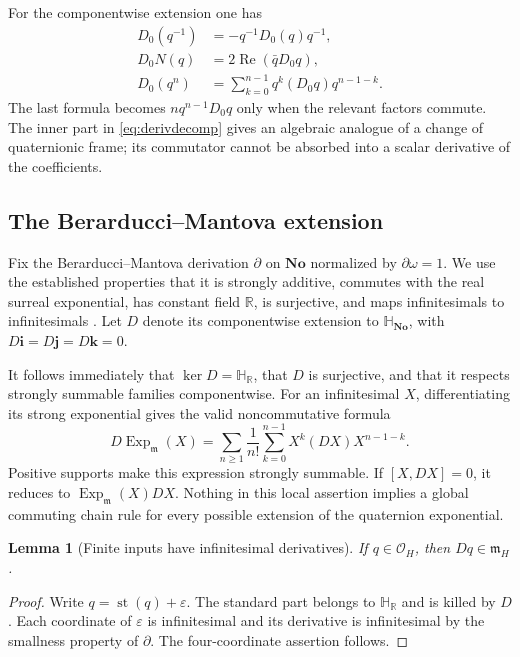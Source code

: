 \documentclass[11pt,letterpaper]{article}
\numberwithin{equation}{section}
\newtheorem{lemma}[lemma]{Lemma}
\theoremstyle{definition}
\theoremstyle{remark}
\newcommand{\No}{\mathbf{No}}
\newcommand{\SQ}{\mathbb H_{\No}}
\newcommand{\HR}{\mathbb H_{\mathbb R}}
\newcommand{\R}{\mathbb R}
\newcommand{\OO}{\mathcal O}
\newcommand{\mm}{\mathfrak m}
\newcommand{\eps}{\varepsilon}
\newcommand{\ii}{\mathbf i}
\newcommand{\jj}{\mathbf j}
\newcommand{\kk}{\mathbf k}
\newcommand{\Rea}{\operatorname{Re}}
\newcommand{\st}{\operatorname{st}}
\newcommand{\Exp}{\operatorname{Exp}}
\begin{document}
For the componentwise extension one has
\begin{align}\label{eq:derivformulas}
 D_0(q^{-1})&=-q^{-1}D_0(q)q^{-1},\\
 D_0N(q)&=2\Rea(\bar qD_0q),\\
 D_0(q^n)&=\sum_{k=0}^{n-1}q^k(D_0q)q^{n-1-k}.
\end{align}
The last formula becomes $nq^{n-1}D_0q$ only when the relevant factors commute. The inner
part in \eqref{eq:derivdecomp} gives an algebraic analogue of a change of quaternionic frame;
its commutator cannot be absorbed into a scalar derivative of the coefficients.

\subsection{The Berarducci--Mantova extension}
Fix the Berarducci--Mantova derivation $\partial$ on $\No$ normalized by
$\partial\omega=1$. We use the established properties that it is strongly additive,
commutes with the real surreal exponential, has constant field $\R$, is surjective, and
maps infinitesimals to infinitesimals \cite[Theorems A and B]{BM}. Let $D$ denote its componentwise extension
to $\SQ$, with $D\ii=D\jj=D\kk=0$.

It follows immediately that $\ker D=\HR$, that $D$ is surjective, and that it respects
strongly summable families componentwise. For an infinitesimal $X$, differentiating its
strong exponential gives the valid noncommutative formula
\begin{equation}\label{eq:dexp}
 D\Exp_{\mm}(X)=
 \sum_{n\ge1}\frac1{n!}\sum_{k=0}^{n-1}X^k(DX)X^{n-1-k}.
\end{equation}
Positive supports make this expression strongly summable. If $[X,DX]=0$, it reduces to
$\Exp_{\mm}(X)DX$. Nothing in this local assertion implies a global commuting chain rule
for every possible extension of the quaternion exponential.

\begin{lemma}[Finite inputs have infinitesimal derivatives]\label{lem:small}
If $q\in\OO_H$, then $Dq\in\mm_H$.
\end{lemma}
\begin{proof}
Write $q=\st(q)+\eps$. The standard part belongs to $\HR$ and is killed by $D$.
Each coordinate of $\eps$ is infinitesimal and its derivative is infinitesimal by the smallness
property of $\partial$. The four-coordinate assertion follows.
\end{proof}
\end{document}
